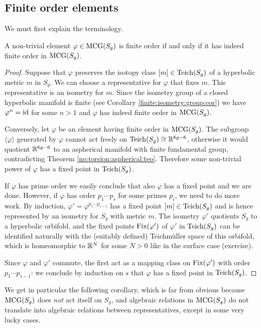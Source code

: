 \subsection{Finite order elements}
We must first explain the terminology.

\begin{prop} \label{finite:finite:prop}
A non-trivial element $\varphi\in{\rm MCG}(S_g)$ is finite order if and only if it has indeed finite order in ${\rm MCG}(S_g)$.
\end{prop}
\begin{proof}
Suppose that $\varphi$ preserves the isotopy class $[m]\in{\rm Teich}(S_g)$ of a hyperbolic metric $m$ in $S_g$. We can choose a representative for $\varphi$ that fixes $m$. This representative is an isometry for $m$.
Since the isometry group of a closed hyperbolic manifold is finite (see Corollary \ref{finite:isometry:group:cor}) we have $\varphi^n={\rm id}$ for some $n>1$ and $\varphi$ has indeed finite order in ${\rm MCG}(S_g)$. 

Conversely, let $\varphi$ be an element having finite order in ${\rm MCG}(S_g)$. The subgroup $\langle \varphi \rangle$ generated by $\varphi$ cannot act freely on ${\rm Teich}(S_g) \cong  \mathbb{R}^{6g-6}$, otherwise it would quotient $\mathbb{R}^{6g-6}$ to an aspherical manifold with finite fundamental group, contradicting Theorem \ref{no:torsion:aspherical:teo}. Therefore some non-trivial power of $\varphi$ has a fixed point in ${\rm Teich}(S_g)$.

If $\varphi$ has prime order we easily conclude that also $\varphi$ has a fixed point and we are done. However, if $\varphi$ has order $p_1\cdots p_s$ for some primes $p_i$, we need to do more work. By induction, $\varphi' = \varphi^{p_1\cdots p_{s-1}}$ has a fixed point $[m]\in{\rm Teich}(S_g)$ and is hence represented by an isometry for $S_g$ with metric $m$. The isometry $\varphi'$ quotients $S_g$ to a hyperbolic orbifold, and the fixed points ${\rm Fix}(\varphi')$ of $\varphi'$ in ${\rm Teich}(S_g)$ can be identified naturally with the (suitably defined) Teichm\"uller space of this orbifold, which is homeomorphic to $\mathbb{R}^N$ for some $N>0$ like in the surface case (exercise).

Since $\varphi$ and $\varphi'$ commute, the first act as a mapping class on ${\rm Fix}(\varphi')$ with order $p_1\cdots p_{s-1}$: we conclude by induction on $s$ that $\varphi$ has a fixed point in ${\rm Teich}(S_g)$.
\end{proof}

We get in particular the following corollary, which is far from obvious because ${\rm MCG}(S_g)$ does \emph{not} act itself on $S_g$, and algebraic relations in ${\rm MCG}(S_g)$ do not translate into algebraic relations between representatives, except in some very lucky cases.

